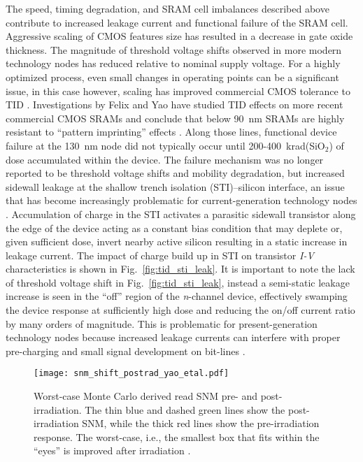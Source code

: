 The speed, timing degradation, and SRAM cell imbalances described above contribute to increased leakage current and functional failure of the SRAM cell.
Aggressive scaling of CMOS features size has resulted in a decrease in gate oxide thickness.
The magnitude of threshold voltage shifts observed in more modern technology nodes has reduced relative to nominal supply voltage. 
For a highly optimized process, even small changes in operating points can be a significant issue, in this case however, scaling has improved commercial CMOS tolerance to TID \cite{Barnaby:2006cp,Felix:2006jl}. 
Investigations by Felix and Yao have studied TID effects on more recent commercial CMOS SRAMs and conclude that below 90~nm SRAMs are highly resistant to ``pattern imprinting'' effects \cite{Felix:2006jl,Yao:2008ce,Nair:2013to}.
Along those lines, functional device failure at the 130~nm node did not typically occur until 200-400~krad(SiO$_2$) of dose accumulated within the device.
The failure mechanism was no longer reported to be threshold voltage shifts and mobility degradation, but increased sidewall leakage at the shallow trench isolation (STI)--silicon interface, an issue that has become increasingly problematic for current-generation technology nodes \cite{Felix:2006jl,Barnaby:2006cp}. 
Accumulation of charge in the STI activates a parasitic sidewall transistor along the edge of the device acting as a constant bias condition that may deplete or, given sufficient dose, invert nearby active silicon resulting in a static increase in leakage current.
The impact of charge build up in STI on transistor \emph{I-V} characteristics is shown in Fig.~\ref{fig:tid_sti_leak}.
It is important to note the lack of threshold voltage shift in Fig.~\ref{fig:tid_sti_leak}, instead a semi-static leakage increase is seen in the ``off'' region of the \emph{n}-channel device, effectively swamping the device response at sufficiently high dose and reducing the on/off current ratio by many orders of magnitude.
This is problematic for present-generation technology nodes because increased leakage currents can interfere with proper pre-charging and small signal development on bit-lines \cite{Yao:2008ce}.

\begin{figure}[tb]
    \begin{center}
        \texttt{[image: snm\_shift\_postrad\_yao\_etal.pdf]}
    \end{center}
    \caption[Worst-case Monte Carlo derived read SNM pre- and post-irradiation. The thin blue and dashed green lines show the post-irradiation SNM, while the thick red lines show the pre-irradiation response. The worst-case, i.e., the smallest box that fits within the ``eyes'' is improved after irradiation.]{Worst-case Monte Carlo derived read SNM pre- and post-irradiation. The thin blue and dashed green lines show the post-irradiation SNM, while the thick red lines show the pre-irradiation response. The worst-case, i.e., the smallest box that fits within the ``eyes'' is improved after irradiation \cite{Yao:2008ce}.}
    \label{fig:snm_shift_tid_yao}
\end{figure}

